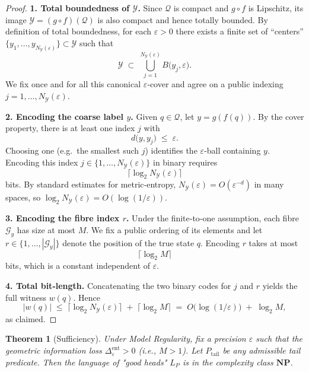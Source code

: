 \documentclass[12pt]{article}
\theoremstyle{definition}
\theoremstyle{plain}
\newtheorem{theorem}{Theorem}[section]
\begin{document}
\begin{proof}
\noindent\textbf{1. Total boundedness of \(\mathcal Y\).}  
Since \(\mathcal Q\) is compact and \(g\circ f\) is Lipschitz, its image 
\(\mathcal Y = (g\circ f)(\mathcal Q)\) is also compact and hence totally bounded.  
By definition of total boundedness, for each \(\varepsilon>0\) there exists a finite set of “centers” 
\(\{y_1,\dots,y_{N_{\mathcal Y}(\varepsilon)}\}\subset\mathcal Y\) such that
\[
\mathcal Y \;\subset\;\bigcup_{j=1}^{N_{\mathcal Y}(\varepsilon)} B\bigl(y_j,\varepsilon\bigr).
\]
We fix once and for all this canonical \(\varepsilon\)‐cover and agree on a public indexing \(j=1,\dots,N_{\mathcal Y}(\varepsilon)\).

\medskip\noindent\textbf{2. Encoding the coarse label \(y\).}  
Given \(q\in\mathcal Q\), let \(y = g(f(q))\).  By the cover property, there is at least one index \(j\) with 
\[
d\bigl(y,y_j\bigr)\;\le\;\varepsilon.
\]
Choosing one (e.g.\ the smallest such \(j\)) identifies the \(\varepsilon\)‐ball containing \(y\).  
Encoding this index \(j\in\{1,\dots,N_{\mathcal Y}(\varepsilon)\}\) in binary requires
\[
\lceil \log_2 N_{\mathcal Y}(\varepsilon)\rceil
\]
bits.  By standard estimates for metric‐entropy, \(N_{\mathcal Y}(\varepsilon)=O(\varepsilon^{-d})\) in many spaces, so
\(\log_2 N_{\mathcal Y}(\varepsilon)=O(\log(1/\varepsilon))\).

\medskip\noindent\textbf{3. Encoding the fibre index \(r\).}  
Under the finite‐to‐one assumption, each fibre \(\mathcal G_y\) has size at most \(M\).  
We fix a public ordering of its elements and let \(r\in\{1,\dots,|\mathcal G_y|\}\) denote the position of the true state \(q\).  
Encoding \(r\) takes at most
\[
\lceil \log_2 M\rceil
\]
bits, which is a constant independent of \(\varepsilon\).

\medskip\noindent\textbf{4. Total bit‐length.}  
Concatenating the two binary codes for \(j\) and \(r\) yields the full witness \(w(q)\).  Hence
\[
|w(q)| \;\le\; \lceil \log_2 N_{\mathcal Y}(\varepsilon)\rceil \;+\;\lceil \log_2 M\rceil
\;=\; O\bigl(\log(1/\varepsilon)\bigr)\;+\;\log_2 M,
\]
as claimed.
\end{proof}


\begin{theorem}[Sufficiency]\label{thm:sufficiency}
Under Model Regularity, fix a precision $\varepsilon$ such that the geometric information loss $\Delta^{\text{ent}}_\varepsilon > 0$ (i.e., $M > 1$). Let $P_{\mathrm{tail}}$ be any admissible tail predicate. Then the language of "good heads" $L_P$ is in the complexity class $\mathbf{NP}$.
\end{theorem}
\end{document}
